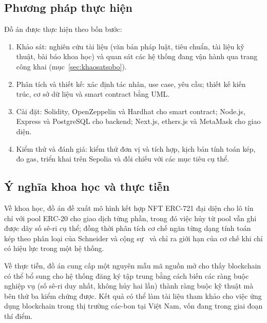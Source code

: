 \subsection*{Phương pháp thực hiện}
\label{subsec:phuongphap}

Đồ án được thực hiện theo bốn bước:
\begin{enumerate}
    \item Khảo sát: nghiên cứu tài liệu (văn bản pháp luật, tiêu chuẩn, tài liệu kỹ thuật, bài báo khoa học) và quan sát các hệ thống đang vận hành qua trang công khai (mục~\ref{sec:khaosatsobo}).
    \item Phân tích và thiết kế: xác định tác nhân, use case, yêu cầu; thiết kế kiến trúc, cơ sở dữ liệu và smart contract bằng UML.
    \item Cài đặt: Solidity, OpenZeppelin và Hardhat cho smart contract; Node.js, Express và PostgreSQL cho backend; Next.js, ethers.js và MetaMask cho giao diện.
    \item Kiểm thử và đánh giá: kiểm thử đơn vị và tích hợp, kịch bản tính toán kép, đo gas, triển khai trên Sepolia và đối chiếu với các mục tiêu cụ thể.
\end{enumerate}

\subsection*{Ý nghĩa khoa học và thực tiễn}
\label{subsec:ynghia}

Về khoa học, đồ án đề xuất mô hình kết hợp NFT ERC-721 đại diện cho lô tín chỉ với pool ERC-20 cho giao dịch từng phần, trong đó việc hủy từ pool vẫn ghi được dãy số sê-ri cụ thể; đồng thời phân tích cơ chế ngăn từng dạng tính toán kép theo phân loại của Schneider và cộng sự~\cite{schneider2019double} và chỉ ra giới hạn của cơ chế khi chỉ có hiệu lực trong một hệ thống.

Về thực tiễn, đồ án cung cấp một nguyên mẫu mã nguồn mở cho thấy blockchain có thể bổ sung cho hệ thống đăng ký tập trung bằng cách biến các ràng buộc nghiệp vụ (số sê-ri duy nhất, không hủy hai lần) thành ràng buộc kỹ thuật mà bên thứ ba kiểm chứng được. Kết quả có thể làm tài liệu tham khảo cho việc ứng dụng blockchain trong thị trường các-bon tại Việt Nam, vốn đang trong giai đoạn thí điểm.

